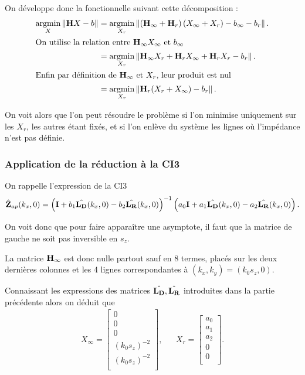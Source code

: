 On développe donc la fonctionnelle suivant cette décomposition :
\begin{align*}
{\underset{X}{\operatorname{argmin}}}\left\rVert {\mathbf{H}} X - {b} \right \rVert &= {\underset{X_r}{\operatorname{argmin}}}\left\rVert \left({\mathbf{H}}_\infty + {\mathbf{H}}_r\right)\left( X_\infty + X_r \right) - {b}_\infty - {b}_r \right \rVert.
\\
\intertext{On utilise la relation entre \({\mathbf{H}}_\infty X_\infty\) et \({b}_\infty\)}
&=  {\underset{X_r}{\operatorname{argmin}}}\left\rVert {\mathbf{H}}_\infty X_r + {\mathbf{H}}_r X_\infty + {\mathbf{H}}_r X_r - {b}_r \right \rVert.
\\
\intertext{Enfin par définition de \({\mathbf{H}}_\infty\) et \(X_r\), leur produit est nul}
&= {\underset{X_r}{\operatorname{argmin}}} \left\rVert {\mathbf{H}}_r ( X_r + X_\infty)- {b}_r \right \rVert.
\end{align*}

On voit alors que l'on peut résoudre le problème si l'on minimise uniquement sur les \(X_r\), les autres étant fixés, et si l'on enlève du système les lignes où l'impédance n'est pas définie.

\subsubsection{Application de la réduction à la CI3}

On rappelle l'expression de la CI3
\begin{equation*}
  \hat{\mathbf{Z}}_{ap}(k_x,0) = \left(\mathbf{I} + b_1 \hat{\mathbf{L_D}}(k_x,0) - b_2 \hat{\mathbf{L_R}}(k_x,0) \right)^{-1}\left(a_0\mathbf{I} + a_1 \hat{\mathbf{L_D}}(k_x,0) - a_2 \hat{\mathbf{L_R}}(k_x,0) \right).
\end{equation*}

On voit donc que pour faire apparaître une asymptote, il faut que la matrice de gauche ne soit pas inversible en \(s_z\).

La matrice \({\mathbf{H}}_\infty\) est donc nulle partout sauf en 8 termes, placés sur les deux dernières colonnes et les 4 lignes correspondantes à \((k_x,k_y)=(k_0 s_z,0)\).

Connaissant les expressions des matrices \(\hat{\mathbf{L_D}},\hat{\mathbf{L_R}}\) introduites dans la partie précédente alors on déduit que
\begin{align*}
  X_\infty = \begin{bmatrix}
    0\\
    0\\
    0\\
    (k_0 s_z)^{-2}\\
    (k_0 s_z)^{-2}\\
  \end{bmatrix},
  & &
  X_r = \begin{bmatrix}
  a_0\\
  a_1\\
  a_2\\
  0\\
  0\\
  \end{bmatrix}.
\end{align*}

